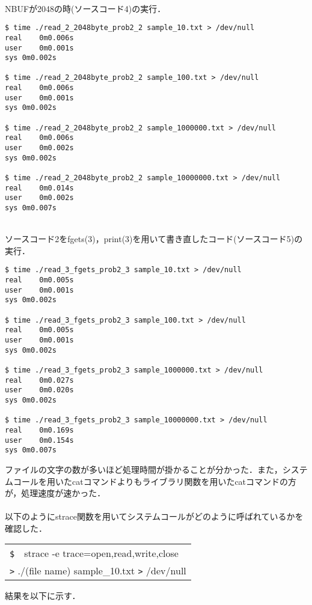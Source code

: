 \documentclass[a4paper,12pt]{jsarticle}
\begin{document}
\\
NBUFが2048の時(ソースコード4)の実行．

\begin{lstlisting}[basicstyle=\footnotesize,caption={time\_read\_2\_2048byte\_prob2\_2}, label=time2048]
$ time ./read_2_2048byte_prob2_2 sample_10.txt > /dev/null
real	0m0.006s
user	0m0.001s
sys	0m0.002s

$ time ./read_2_2048byte_prob2_2 sample_100.txt > /dev/null
real	0m0.006s
user	0m0.001s
sys	0m0.002s

$ time ./read_2_2048byte_prob2_2 sample_1000000.txt > /dev/null
real	0m0.006s
user	0m0.002s
sys	0m0.002s

$ time ./read_2_2048byte_prob2_2 sample_10000000.txt > /dev/null
real	0m0.014s
user	0m0.002s
sys	0m0.007s
\end{lstlisting}

\\
ソースコード2をfgets(3)，print(3)を用いて書き直したコード(ソースコード5)の実行．
\begin{lstlisting}[basicstyle=\footnotesize, caption={time\_read\_3\_fgets\_prob2\_3}, label=timefgets]
$ time ./read_3_fgets_prob2_3 sample_10.txt > /dev/null
real	0m0.005s
user	0m0.001s
sys	0m0.002s

$ time ./read_3_fgets_prob2_3 sample_100.txt > /dev/null
real	0m0.005s
user	0m0.001s
sys	0m0.002s

$ time ./read_3_fgets_prob2_3 sample_1000000.txt > /dev/null
real	0m0.027s
user	0m0.020s
sys	0m0.002s

$ time ./read_3_fgets_prob2_3 sample_10000000.txt > /dev/null
real	0m0.169s
user	0m0.154s
sys	0m0.007s
\end{lstlisting}
\vspace{1zh}

ファイルの文字の数が多いほど処理時間が掛かることが分かった．また，システムコールを用いたcatコマンドよりもライブラリ関数を用いたcatコマンドの方が，処理速度が速かった．\\
\\
以下のようにstrace関数を用いてシステムコールがどのように呼ばれているかを確認した．

\begin{table}[H]
  \begin{center}
    \begin{tabular}{|p{150mm}|}
      \hline
      \verb|$|　strace -e trace=open,read,write,close                           \\
      \verb|>|  ./(file name) sample\_10.txt  \verb|>|  /dev/null \\
      \hline
    \end{tabular}
  \end{center}
\end{table}
\vspace{-2zh}
結果を以下に示す．
\end{document}
